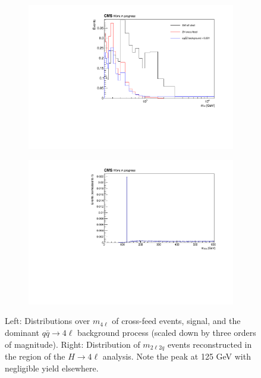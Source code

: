 \begin{figure}[!hbt]
\centering
\begin{subfigure}[t]{0.45\textwidth}
    \includegraphics[width=\textwidth]{figures/M4L_proj_incl.pdf}
\end{subfigure}
\begin{subfigure}[t]{0.52\textwidth}
    \includegraphics[width=\textwidth]{figures/phantomm2l2q.pdf}
\end{subfigure}
\caption{Left: Distributions over $m_{4\ell}$ of \onshell cross-feed events, \offshell signal, and the dominant 
$q\bar{q} \to 4\ell$ background process (scaled down by three orders of magnitude).
Right: Distribution of $m_{2\ell2q}$ events reconstructed in the \offshell region 
of the $H\to 4\ell$ analysis. Note the peak at 125 GeV with negligible yield elsewhere.}
\label{fig:crossfeed}
\end{figure}
